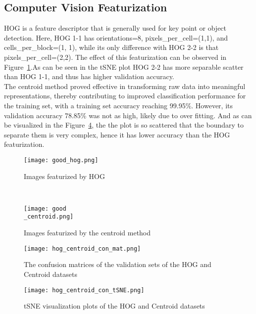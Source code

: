 \documentclass{article}
\begin{document}
\subsection{Computer Vision Featurization}
HOG is a feature descriptor that is generally used for key point or object detection. Here, HOG 1-1 has orientations=8, pixels\_per\_cell=(1,1), and cells\_per\_block=(1, 1), while its only difference with HOG 2-2 is that pixels\_per\_cell=(2,2). The effect of this featurization can be observed in Figure~\ref{good_hog}.As can be seen in the tSNE plot HOG 2-2 has more separable scatter than HOG 1-1, and thus has higher validation accuracy.
\\
The centroid method proved effective in transforming raw data into meaningful representations, thereby contributing to improved classification performance for the training set, with a training set accuracy reaching 99.95\%. However, its validation accuracy 78.85\% was not as high, likely due to over fitting. And as can be visualized in the Figure~\ref{hog_tSNE}, the the plot is so scattered that the boundary to separate them is very complex, hence it has lower accuracy than the HOG featurization.

\begin{figure*}[ht]
    \centering
    \begin{subfigure}[t]{0.5\textwidth}
        \centering
\centerline{\texttt{[image: good\_hog.png]}}
        \caption{Images featurized by HOG}
        \label{good_hog}
    \end{subfigure}%
    ~ 
    \begin{subfigure}[t]{0.5\textwidth}
        \centering
\centerline{\texttt{[image: good\\\_centroid.png]}}
        \caption{Images featurized by the centroid method}  
        \label{good_centroid}
    \end{subfigure}
    \caption{Images featurized by computer vision techniques}
\end{figure*}
\begin{figure}
\centerline{\texttt{[image: hog\_centroid\_con\_mat.png]}}
\caption{The confusion matrices of the validation sets of the HOG and Centroid datasets}
\label{hog_con_mat}
\end{figure}
\begin{figure}[ht]
\centerline{\texttt{[image: hog\_centroid\_con\_tSNE.png]}}
\caption{tSNE visualization plots of the HOG and Centroid datasets}
\label{hog_tSNE}
\end{figure}
\end{document}
